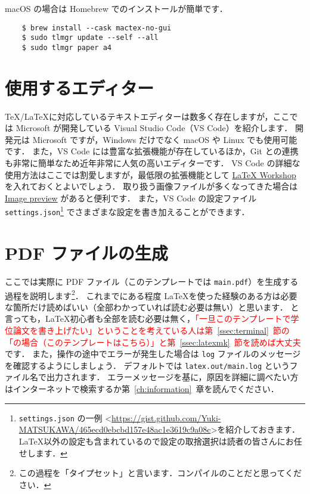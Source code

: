 macOS の場合は Homebrew でのインストールが簡単です．
\begin{verbatim}
    $ brew install --cask mactex-no-gui
    $ sudo tlmgr update --self --all
    $ sudo tlmgr paper a4
\end{verbatim}

\section{使用するエディター}
\label{sec:editor}

\TeX/\LaTeX に対応しているテキストエディターは数多く存在しますが，ここでは Microsoft が開発している Visual Studio Code（VS Code）を紹介します．
開発元は Microsoft ですが，Windows だけでなく macOS や Linux でも使用可能です．
また，VS Code には豊富な拡張機能が存在しているほか，Git との連携も非常に簡単なため近年非常に人気の高いエディターです．
VS Code の詳細な使用方法はここでは割愛しますが，最低限の拡張機能として \href{https://marketplace.visualstudio.com/items?itemName=James-Yu.latex-workshop}{LaTeX Workshop} を入れておくとよいでしょう．
取り扱う画像ファイルが多くなってきた場合は \href{https://marketplace.visualstudio.com/items?itemName=kisstkondoros.vscode-gutter-preview}{Image preview} があると便利です．
また，VS Code の設定ファイル \verb|settings.json|\footnote{\texttt{settings.json} の一例 \textless\url{https://gist.github.com/Yuki-MATSUKAWA/465ecd0ebcbd157e48ac1e3619c9a08c}\textgreater を紹介しておきます．\LaTeX 以外の設定も含まれているので設定の取捨選択は読者の皆さんにお任せします．} でさまざまな設定を書き加えることができます．

\section{PDF ファイルの生成}
\label{sec:makepdf}

ここでは実際に PDF ファイル（このテンプレートでは \verb|main.pdf|）を生成する過程を説明します\footnote{この過程を「タイプセット」と言います．コンパイルのことだと思ってください．}．
これまでにある程度 \LaTeX を使った経験のある方は必要な箇所だけ読めばいい（全部わかっていれば読む必要は無い）と思います．
と言っても，\LaTeX 初心者も全部を読む必要は無く，\textcolor{red}{「一旦このテンプレートで学位論文を書き上げたい」ということを考えている人は第~\ref{ssec:terminal}~節の「\LuaLaTeX の場合（このテンプレートはこちら）」と第~\ref{ssec:latexmk}~節を読めば大丈夫}です．
また，操作の途中でエラーが発生した場合は \verb|log| ファイルのメッセージを確認するようにしましょう．
デフォルトでは \verb|latex.out/main.log| というファイル名で出力されます．
エラーメッセージを基に，原因を詳細に調べたい方はインターネットで検索するか第~\ref{ch:information}~章を読んでください．

